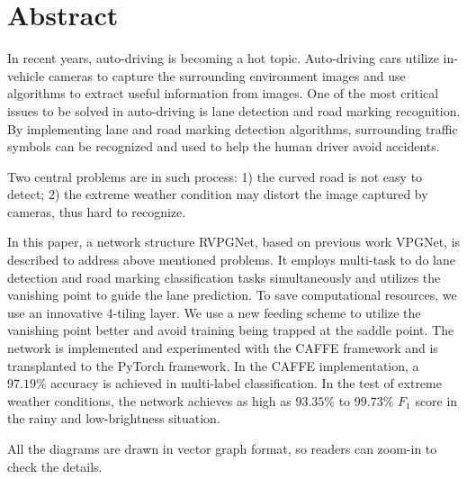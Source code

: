 \newpage
{}
\chapter*{\centering Abstract}
\begin{spacing}{1.3}
\setlength{\parskip}{0.3in}
\thispagestyle{addin}

In recent years, auto-driving is becoming a hot topic. Auto-driving cars utilize in-vehicle cameras to capture the surrounding environment images and use algorithms to extract useful information from images. One of the most critical issues to be solved in auto-driving is lane detection and road marking recognition. By implementing lane and road marking detection algorithms, surrounding traffic symbols can be recognized and used to help the human driver avoid accidents. 

Two central problems are in such process: 1) the curved road is not easy to detect; 2) the extreme weather condition may distort the image captured by cameras, thus hard to recognize.

In this paper, a network structure RVPGNet, based on previous work VPGNet, is described to address above mentioned problems. It employs multi-task to do lane detection and road marking classification tasks simultaneously and utilizes the vanishing point to guide the lane prediction. To save computational resources, we use an innovative 4-tiling layer. We use a new feeding scheme to utilize the vanishing point better and avoid training being trapped at the saddle point. The network is implemented and experimented with the CAFFE framework and is transplanted to the PyTorch framework. In the CAFFE implementation, a $97.19\%$ accuracy is achieved in multi-label classification. In the test of extreme weather conditions, the network achieves as high as $93.35\%$ to $99.73\%$ $F_1$ score in the rainy and low-brightness situation.

All the diagrams are drawn in vector graph format, so readers can zoom-in to check the details.


\end{spacing}
\newpage
